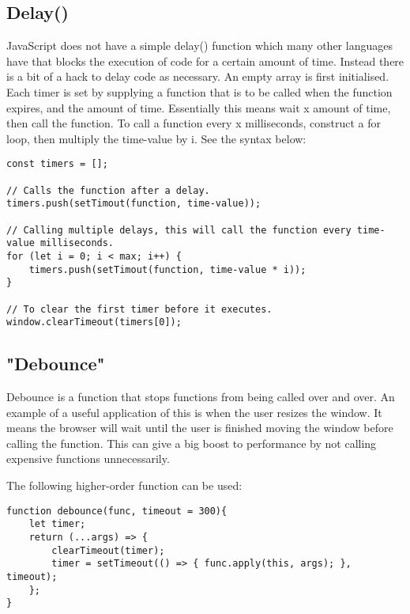 \documentclass[portfolio.tex]{subfiles}
\begin{document}
		\autocite{moz-canvas}

		\subsection{Delay()}
			\label{js-delay}
			JavaScript does not have a simple delay() function which many other languages have that blocks the execution of code for a certain amount of time. Instead there is a bit of a hack to delay code as necessary. An empty array is first initialised. Each timer is set by supplying a function that is to be called when the function expires, and the amount of time. Essentially this means wait x amount of time, then call the function. To call a function every x milliseconds, construct a for loop, then multiply the time-value by i. See the syntax below:

			\begin{lstlisting}
const timers = [];

// Calls the function after a delay.
timers.push(setTimout(function, time-value));

// Calling multiple delays, this will call the function every time-value milliseconds.
for (let i = 0; i < max; i++) {
	timers.push(setTimout(function, time-value * i));
}

// To clear the first timer before it executes.
window.clearTimeout(timers[0]);
			\end{lstlisting}
			\autocite{js-delay}

			\subsection{"Debounce"}
				\label{js-debounce}
				Debounce is a function that stops functions from being called over and over. An example of a useful application of this is when the user resizes the window. It means the browser will wait until the user is finished moving the window before calling the function. This can give a big boost to performance by not calling expensive functions unnecessarily.

				The following higher-order function can be used:

				\begin{lstlisting}
function debounce(func, timeout = 300){
	let timer;
	return (...args) => {
		clearTimeout(timer);
		timer = setTimeout(() => { func.apply(this, args); }, timeout);
	};
}
				\end{lstlisting}
				\autocite{fcc-debounce}\\
\end{document}

